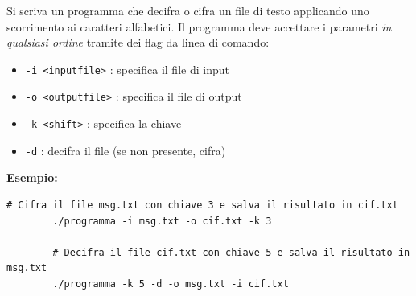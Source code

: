 \begin{Exercise}[label={ex:cifrario}]
    Si scriva un programma che decifra o cifra un file di testo applicando uno scorrimento ai caratteri alfabetici.
    Il programma deve accettare i parametri \emph{in qualsiasi ordine} tramite dei flag da linea di comando:
    \begin{itemize}
        \item \texttt{-i <inputfile>} : specifica il file di input
        \item \texttt{-o <outputfile>} : specifica il file di output
        \item \texttt{-k <shift>} : specifica la chiave
        \item \texttt{-d} : decifra il file (se non presente, cifra)
    \end{itemize}

    \textbf{Esempio:}
    \begin{lstlisting}[style=console]
        # Cifra il file msg.txt con chiave 3 e salva il risultato in cif.txt
        ./programma -i msg.txt -o cif.txt -k 3
        
        # Decifra il file cif.txt con chiave 5 e salva il risultato in msg.txt
        ./programma -k 5 -d -o msg.txt -i cif.txt
    \end{lstlisting}
\end{Exercise}

\begin{Answer}[ref={ex:cifrario}]
  	
\end{Answer}